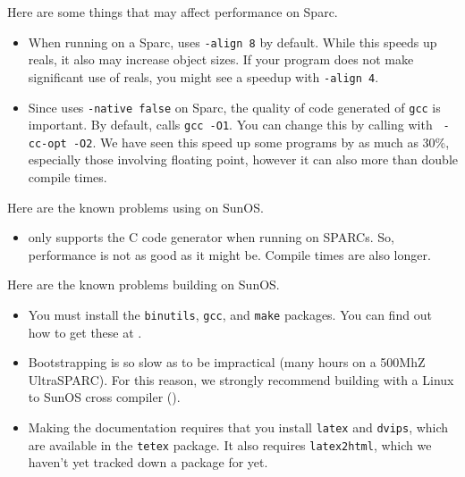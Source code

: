 
Here are some things that may affect performance on Sparc.
\begin{itemize}

\item
When running on a Sparc, {\mlton} uses {\tt -align 8} by default.
While this speeds up reals, it also may increase object sizes.  If
your program does not make significant use of reals, you might see a
speedup with {\tt -align 4}.

\item
Since {\mlton} uses {\tt -native false} on Sparc, the quality of
code generated of {\tt gcc} is important.  By default, {\mlton} calls
{\tt gcc -O1}.  You can change this by calling {\mlton} with {\tt
-cc-opt -O2}.  We have seen this speed up some programs by as much as
30\%, especially those involving floating point, however it can also
more than double compile times.

\end{itemize}

Here are the known problems using {\mlton} on SunOS.

\begin{itemize}

\item {\mlton} only supports the C code generator when running on
SPARCs. So, performance is not as good as it might be.  Compile times
are also longer.

\end{itemize}

Here are the known problems building {\mlton} on SunOS.

\begin{itemize}

\item You must install the {\tt binutils}, {\tt gcc}, and {\tt make}
packages.  You can find out how to get these at
.

\item Bootstrapping is so slow as to be impractical (many hours on a
500MhZ UltraSPARC).  For this reason, we strongly recommend building
with a Linux to SunOS cross compiler ().

\item Making the documentation requires that you install {\tt latex}
and {\tt dvips}, which are available in the {\tt tetex} package.  It
also requires {\tt latex2html}, which we haven't yet tracked down a
package for yet.

\end{itemize}
